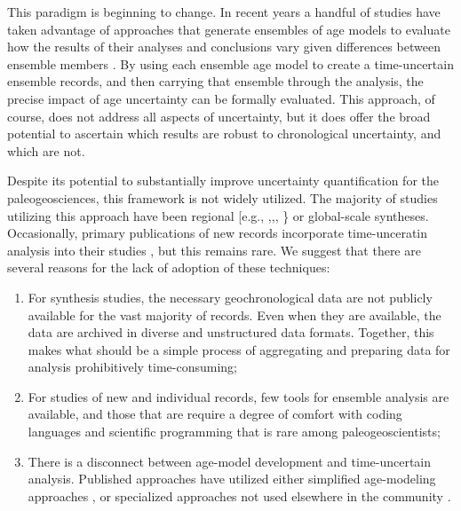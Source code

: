 \documentclass[gc, manuscript]{copernicus}
\begin{document}
This paradigm is beginning to change.
In recent years a handful of studies have taken advantage of approaches that generate ensembles of age models to evaluate how the results of their analyses and conclusions vary given differences between ensemble members \citep[\citet{Rhines_JGR2011},\citet{Anchukaitis_Tierney2012},\citet{Shakun_Nature2012},\citet{Marcott_Science2013}, \citet{Tierney2013}]{Haam_Huybers2010}.
By using each ensemble age model to create a time-uncertain ensemble records, and then carrying that ensemble through the analysis, the precise impact of age uncertainty can be formally evaluated.
This approach, of course, does not address all aspects of uncertainty, but it does offer the broad potential to ascertain which results are robust to chronological uncertainty, and which are not.

Despite its potential to substantially improve uncertainty quantification for the paleogeosciences, this framework is not widely utilized.
The majority of studies utilizing this approach have been regional {[}e.g., \citet{Anchukaitis_Tierney2012},\citet{Tierney2013},\citet{mckay_onset_2018}, \citet{routson2018}\} or global-scale \citep[e.g.,][\citet{Marcott_Science2013},\citet{kaufman2020HoloceneGMST}]{Shakun_Nature2012} syntheses.
Occasionally, primary publications of new records incorporate time-unceratin analysis into their studies \citep[more]{Boldt2015}, but this remains rare.
We suggest that there are several reasons for the lack of adoption of these techniques:

\begin{enumerate}
\def\labelenumi{\arabic{enumi}.}
\item
  For synthesis studies, the necessary geochronological data are not publicly available for the vast majority of records. Even when they are available, the data are archived in diverse and unstructured data formats. Together, this makes what should be a simple process of aggregating and preparing data for analysis prohibitively time-consuming;
\item
  For studies of new and individual records, few tools for ensemble analysis are available, and those that are require a degree of comfort with coding languages and scientific programming that is rare among paleogeoscientists;
\item
  There is a disconnect between age-model development and time-uncertain analysis. Published approaches have utilized either simplified age-modeling approaches \citep{Haam_Huybers2010}, or specialized approaches not used elsewhere in the community \citep[\citet{Anchukaitis_Tierney2012},\citet{Marcott_Science2013},\citet{Tierney2013},\citet{routson2018}]{Shakun_Nature2012}.
\end{enumerate}
\end{document}
